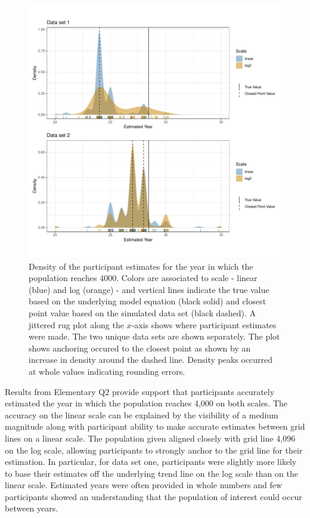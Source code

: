 \documentclass[print]{nuthesis}
\begin{document}
\begin{figure}[tbp]

{\centering \includegraphics[width=1\linewidth,]{thesis_files/figure-latex/qe2-density-plot-1} 

}

\caption[Elementary Q2 density]{Density of the participant estimates for the year in which the population reaches 4000. Colors are associated to scale - linear (blue) and log (orange) - and vertical lines indicate the true value based on the underlying model equation (black solid) and closest point value based on the simulated data set (black dashed). A jittered rug plot along the $x$-axis shows where participant estimates were made. The two unique data sets are shown separately. The plot shows anchoring occured to the closest point as shown by an increase in density around the dashed line. Density peaks occurred at whole values indicating rounding errors.}\label{fig:qe2-density-plot}
\end{figure}

Results from Elementary Q2 provide support that participants accurately estimated the year in which the population reaches 4,000 on both scales.
The accuracy on the linear scale can be explained by the visibility of a medium magnitude along with participant ability to make accurate estimates between grid lines on a linear scale.
The population given aligned closely with grid line 4,096 on the log scale, allowing participants to strongly anchor to the grid line for their estimation.
In particular, for data set one, participants were slightly more likely to base their estimates off the underlying trend line on the log scale than on the linear scale.
Estimated years were often provided in whole numbers and few participants showed an understanding that the population of interest could occur between years.
\end{document}
